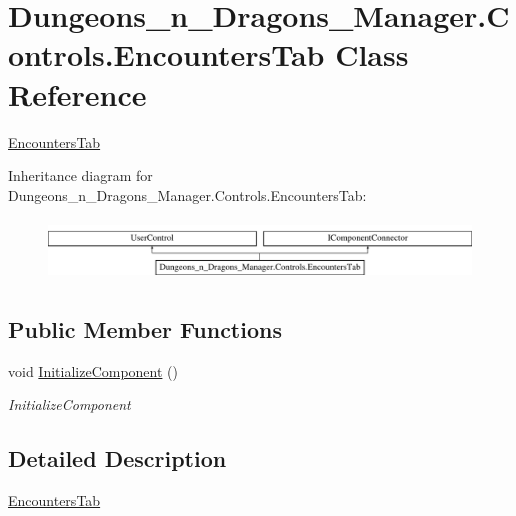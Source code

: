 \hypertarget{class_dungeons__n___dragons___manager_1_1_controls_1_1_encounters_tab}{}\section{Dungeons\+\_\+n\+\_\+\+Dragons\+\_\+\+Manager.\+Controls.\+Encounters\+Tab Class Reference}
\label{class_dungeons__n___dragons___manager_1_1_controls_1_1_encounters_tab}


\mbox{\hyperlink{class_dungeons__n___dragons___manager_1_1_controls_1_1_encounters_tab}{Encounters\+Tab}}  


Inheritance diagram for Dungeons\+\_\+n\+\_\+\+Dragons\+\_\+\+Manager.\+Controls.\+Encounters\+Tab\+:\begin{figure}[H]
\begin{center}
\leavevmode
\includegraphics[height=1.627907cm]{class_dungeons__n___dragons___manager_1_1_controls_1_1_encounters_tab}
\end{center}
\end{figure}
\subsection*{Public Member Functions}
\begin{DoxyCompactItemize}
\item 
void \mbox{\hyperlink{class_dungeons__n___dragons___manager_1_1_controls_1_1_encounters_tab_a66ddb157c3c46a45afce53e377a417cc}{Initialize\+Component}} ()
\begin{DoxyCompactList}\small\item\em Initialize\+Component \end{DoxyCompactList}\end{DoxyCompactItemize}


\subsection{Detailed Description}
\mbox{\hyperlink{class_dungeons__n___dragons___manager_1_1_controls_1_1_encounters_tab}{Encounters\+Tab}} 



